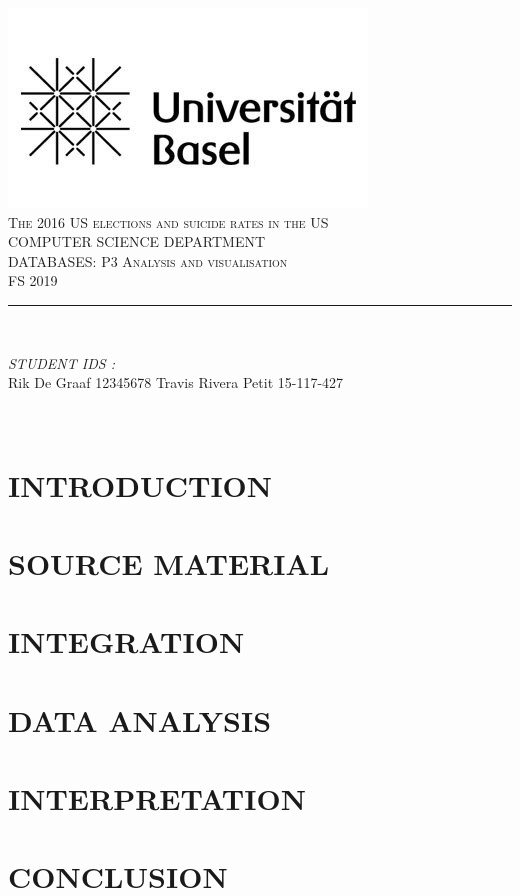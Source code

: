 \documentclass[12pt]{article}
\begin{document}
\begin{titlepage}
	\centering
    \vspace*{0.5 cm}
    \includegraphics[scale = 0.5]{images/unibas_logo.jpeg}\\[1.0 cm]
    \textsc{\LARGE  The 2016 US elections and suicide rates in the US}\\[2.0 cm]
    \textsc{ COMPUTER SCIENCE DEPARTMENT}\\[0.2 cm]
    \textsc{DATABASES: P3 Analysis and visualisation}\\[0.2cm]
	\textsc{\Large FS 2019}\\[0.5 cm]
	\rule{\linewidth}{0.2 mm} \\[0.4 cm]

	\begin{minipage}{0.4\textwidth}

			\begin{flushright}
			\emph{STUDENT IDS :} \\
				Rik De Graaf {\color{red}12345678}\linebreak
			Travis Rivera Petit 15-117-427\linebreak
		\end{flushright}
	\end{minipage}\\[2 cm]


	\vfill

\end{titlepage}



\section{INTRODUCTION}


\section{SOURCE MATERIAL}


\section{INTEGRATION}


\section{DATA ANALYSIS}


\section{INTERPRETATION}


\section{CONCLUSION}



%
%
\end{document}
